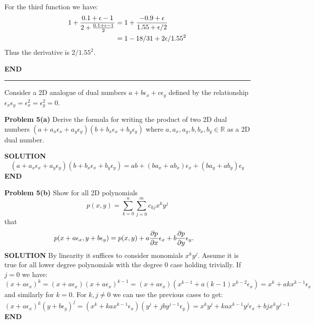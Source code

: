 \documentclass[12pt,a4paper]{article}
\begin{document}
For the third function we have:
\begin{align*}
{1 + {0.1+\ensuremath{\epsilon} - 1 \over 2 + {0.1+\ensuremath{\epsilon}-1 \over 2}}} &=  {1 + {-0.9+\ensuremath{\epsilon} \over 1.55 + \ensuremath{\epsilon}/2}}\\
&= 1 -18/31 + 2\ensuremath{\epsilon}/1.55^2
\end{align*}
Thus the derivative is $2/1.55^2$.

\textbf{END}

\rule{\textwidth}{1pt}
Consider a 2D analogue of dual numbers $a + b \ensuremath{\epsilon}_x + c \ensuremath{\epsilon}_y$ defined by the relationship  $\ensuremath{\epsilon}_x \ensuremath{\epsilon}_y = \ensuremath{\epsilon}_x^2 =  \ensuremath{\epsilon}_y^2 = 0$. 

\textbf{Problem 5(a)}  Derive the formula for writing the product of two 2D dual numbers $(a + a_x \ensuremath{\epsilon}_x + a_y \ensuremath{\epsilon}_y) (b + b_x \ensuremath{\epsilon}_x + b_y \ensuremath{\epsilon}_y)$ where $a,a_x,a_y,b,b_x,b_y \in \mathbb R$ as a 2D dual number.

\textbf{SOLUTION}
\[
(a+a_x \ensuremath{\epsilon}_x +  a_y \ensuremath{\epsilon}_y)  (b+b_x \ensuremath{\epsilon}_x +  b_y \ensuremath{\epsilon}_y)
= ab +(ba_x + ab_x) \ensuremath{\epsilon}_x +  (ba_y+ab_y) \ensuremath{\epsilon}_y
\]
\textbf{END}

\textbf{Problem 5(b)} Show  for all 2D polynomials
\[
p(x,y) = \sum_{k=0}^n \sum_{j=0}^m c_{kj} x^k y^j
\]
that
\begin{align*}
p(x + a \ensuremath{\epsilon}_x, y + b \ensuremath{\epsilon}_y) &= p(x,y) + a  {\ensuremath{\partial} p \over \ensuremath{\partial} x} \ensuremath{\epsilon}_x  +  b  {\ensuremath{\partial} p \over \ensuremath{\partial} y}   \ensuremath{\epsilon}_y.
\end{align*}
\textbf{SOLUTION} By linearity it suffices to consider monomials $x^k y^j$. Assume it is true for all lower degree polynomials with the degree $0$ case holding trivially. If $j = 0$ we  have:
\[
(x + a \ensuremath{\epsilon}_x)^k = (x + a \ensuremath{\epsilon}_x)(x + a \ensuremath{\epsilon}_x)^{k-1} = 
 (x + a \ensuremath{\epsilon}_x)(x^{k-1} + a (k-1) x^{k-2} \ensuremath{\epsilon}_x) = 
  x^k  + a k x^{k-1} \ensuremath{\epsilon}_x
\]
and similarly for $k = 0$. For $k,j \neq 0$ we can use the previous cases to get:
\[
(x + a \ensuremath{\epsilon}_x)^k (y + b \ensuremath{\epsilon}_y)^j = (x^k + k a x^{k-1} \ensuremath{\epsilon}_x) (y^j + j b y^{j-1} \ensuremath{\epsilon}_y)= 
x^k y^j + k a x^{k-1} y^j \ensuremath{\epsilon}_x + b j x^k y^{j-1}
\]
\textbf{END}
\end{document}
